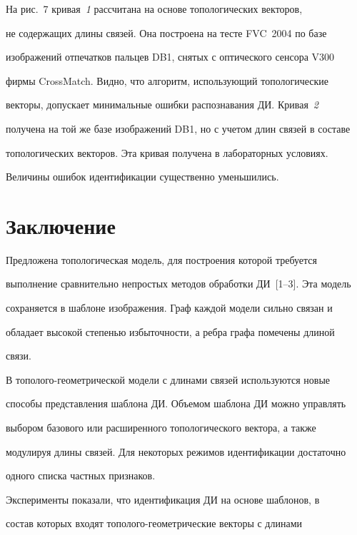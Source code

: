   На рис.~7 кривая~\textit{1} рассчитана на основе топологических векторов, 


не содержащих длины связей. Она построена на тесте FVC~2004 по базе 


изображений отпечатков пальцев DB1, снятых с оптического сенсора V300 


фирмы CrossMatch. Видно, что алгоритм, использующий топологические 


векторы, допускает минимальные ошибки распознавания ДИ. Кривая~\textit{2} 


получена на той же базе изоб\-ра\-же\-ний DB1, но с учетом длин связей в составе 


топологических векторов. Эта кривая получена в лабораторных условиях. 


Величины ошибок идентификации существенно уменьшились.


  


\section{Заключение}





  Предложена топологическая модель, для построения которой требуется 


выполнение сравнительно непростых методов обработки ДИ~[1--3]. Эта модель 


сохраняется в шаблоне изображения. Граф каждой модели сильно связан и 


обладает высокой степенью избыточности, а ребра графа помечены длиной 


связи.





В тополого-геометрической модели с длинами связей используются новые 


способы представления шаблона ДИ. Объемом шаблона ДИ можно управлять 


выбором базового или расширенного топологического вектора, а также 


модулируя длины связей. Для некоторых режимов идентификации достаточно 


одного списка частных признаков.





  Эксперименты показали, что идентификация ДИ на основе шаблонов, в 


состав которых входят то\-по\-ло\-го-гео\-мет\-ри\-че\-ские векторы с длинами 


